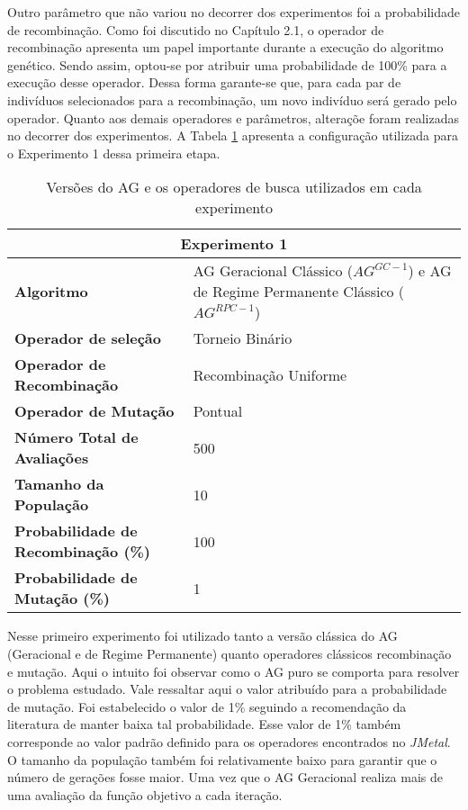 Outro parâmetro que não variou no decorrer dos experimentos foi a probabilidade de recombinação. Como foi discutido no Capítulo 2.1, o operador de recombinação apresenta um papel importante durante a execução do algoritmo genético. Sendo assim, optou-se por atribuir uma probabilidade de 100\% para a execução desse operador. Dessa forma garante-se que, para cada par de indivíduos selecionados para a recombinação, um novo indivíduo será gerado pelo operador. Quanto aos demais operadores e parâmetros, alteraçõe foram realizadas no decorrer dos experimentos. A Tabela \ref{table:con01} apresenta a configuração utilizada para o Experimento 1 dessa primeira etapa.

\begin{table}[H]
\centering
\caption{Versões do AG e os operadores de busca utilizados em cada experimento}
\label{table:con01}
\begin{tabular}{|p{6cm}|p{9cm}|}
\hline
\multicolumn{2}{|c|}{\textbf{Experimento 1}} \\ \hline
{\textbf{Algoritmo}} & AG Geracional Clássico ($AG^{GC-1}$) e AG de Regime Permanente Clássico ($AG^{RPC-1}$) \\ \hline
\textbf{Operador de seleção} & Torneio Binário \\ \hline
\textbf{Operador de Recombinação} & Recombinação Uniforme \\  \hline
\textbf{Operador de Mutação} & Pontual \\ \hline
\textbf{Número Total de Avaliações} & 500 \\ \hline
\textbf{Tamanho da População} & 10 \\ \hline
\textbf{Probabilidade de Recombinação (\%)} & 100 \\ \hline
\textbf{Probabilidade de Mutação (\%)} & 1 \\ \hline
\end{tabular}
\end{table}

Nesse primeiro experimento foi utilizado tanto a versão clássica do AG (Geracional e de Regime Permanente) quanto operadores clássicos recombinação e mutação. Aqui o intuito foi observar como o AG puro se comporta para resolver o problema estudado. Vale ressaltar aqui o valor atribuído para a probabilidade  de mutação. Foi estabelecido o valor de 1\% seguindo a recomendação da literatura de manter baixa tal probabilidade. Esse valor de 1\% também corresponde ao valor padrão definido para os operadores encontrados no \textit{JMetal}. O tamanho da população também foi relativamente baixo para garantir que o número de gerações fosse maior. Uma vez que o AG Geracional realiza mais de uma avaliação da função objetivo a cada iteração.

